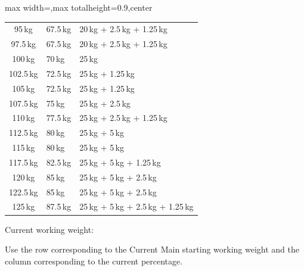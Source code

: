 \documentclass[11pt,a4paper]{article}
\begin{document}
\begin{center}
\begin{adjustbox}{max width=\linewidth,max totalheight=0.9\textheight,center}
\begin{tabular}{cll}
95\,kg   & 67.5\,kg & 20\,kg + 2.5\,kg + 1.25\,kg \\
97.5\,kg & 67.5\,kg & 20\,kg + 2.5\,kg + 1.25\,kg \\
100\,kg  & 70\,kg   & 25\,kg \\
102.5\,kg & 72.5\,kg & 25\,kg + 1.25\,kg \\
105\,kg  & 72.5\,kg & 25\,kg + 1.25\,kg \\
107.5\,kg & 75\,kg   & 25\,kg + 2.5\,kg \\
110\,kg  & 77.5\,kg & 25\,kg + 2.5\,kg + 1.25\,kg \\
112.5\,kg & 80\,kg   & 25\,kg + 5\,kg \\
115\,kg  & 80\,kg   & 25\,kg + 5\,kg \\
117.5\,kg & 82.5\,kg & 25\,kg + 5\,kg + 1.25\,kg \\
120\,kg  & 85\,kg   & 25\,kg + 5\,kg + 2.5\,kg \\
122.5\,kg & 85\,kg   & 25\,kg + 5\,kg + 2.5\,kg \\
125\,kg  & 87.5\,kg & 25\,kg + 5\,kg + 2.5\,kg + 1.25\,kg \\
\bottomrule
\end{tabular}
\end{adjustbox}
\renewcommand{\arraystretch}{1}
\end{center}

Current working weight:

Use the row corresponding to the Current Main starting working weight and the column corresponding to the current percentage.
\end{document}
